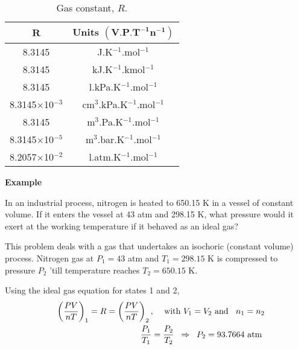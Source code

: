    \begin{table}[h]
     \begin{center}
     \begin{tabular}{||c c||}
       \hline\hline
           $\mathbf{R}$   & {\bf Units} $\mathbf{\left(\text{V.P.T}^{-1}\text{n}^{-1}\right)}$ \\
           \hline\hline
           8.3145    &  J.K$^{-1}$.mol$^{-1}$  \\
           8.3145    &  kJ.K$^{-1}$.kmol$^{-1}$  \\
           8.3145    &  l.kPa.K$^{-1}$.mol$^{-1}$  \\
           8.3145$\times$10$^{-3}$    & cm$^{3}$.kPa.K$^{-1}$.mol$^{-1}$  \\
           8.3145    &  m$^{3}$.Pa.K$^{-1}$.mol$^{-1}$  \\
           8.3145$\times$10$^{-5}$    &  m$^{3}$.bar.K$^{-1}$.mol$^{-1}$  \\
           8.2057$\times$10$^{-2}$ &  l.atm.K$^{-1}$.mol$^{-1}$  \\
           \hline\hline           
     \end{tabular}
     \caption{Gas constant, $R$.}\label{Chapter:Intro_Property_of_Gases:Table:RConst}
     \end{center}
   \end{table}
   
   \begin{MyExample}{\begin{center}{\bf Example}\end{center}}
     \begin{example}\label{Chapter:Intro_Property_of_Gases:Example1}
       In an industrial process, nitrogen is heated to 650.15 K in a vessel of constant volume. If it enters the vessel at 43 atm and 298.15 K, what pressure would it exert at the working temperature if it behaved as an ideal gas?
     \end{example}

        This problem deals with a gas that undertakes an isochoric (\ie constant volume) process. Nitrogen gas at $P_{1} = 43$ atm and $T_{1} = 298.15$ K is compressed to pressure $P_{2}$ 'till temperature reaches $T_{2} = 650.15$ K.

         Using the ideal gas equation for states 1 and 2,
       \begin{eqnarray}
         && \left(\displaystyle\frac{PV}{nT}\right)_{1} = R = \left(\displaystyle\frac{PV}{nT}\right)_{2},\;\;\;\text{ with } V_{1}=V_{2} \text{ and }\;\; n_{1}=n_{2}\nonumber \\
         && \displaystyle\frac{P_{1}}{T_{1}} = \displaystyle\frac{P_{2}}{T_{2}} \;\;\Rightarrow \;\; P_{2}= 93.7664 \text{ atm } \nonumber
         \end{eqnarray}
   \end{MyExample}

